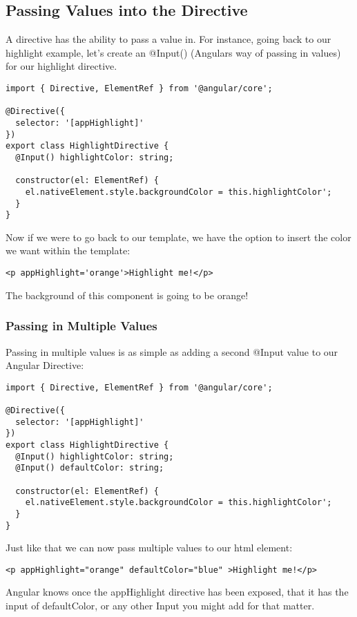 \subsection{ Passing Values into the Directive }
A directive has the ability to pass a value in. For instance, going back to our
highlight example, let's create an @Input() (Angulars way of passing in values)
for our highlight directive.
\begin{lstlisting}
import { Directive, ElementRef } from '@angular/core';

@Directive({
  selector: '[appHighlight]'
})
export class HighlightDirective {
  @Input() highlightColor: string;

  constructor(el: ElementRef) {
    el.nativeElement.style.backgroundColor = this.highlightColor';
  }
}
\end{lstlisting}

Now if we were to go back to our template, we have the option to insert the
color we want within the template:
\begin{lstlisting}
<p appHighlight='orange'>Highlight me!</p>
\end{lstlisting}

The background of this component is going to be orange!

\subsubsection{ Passing in Multiple Values }
Passing in multiple values is as simple as adding a second @Input value to our
Angular Directive:

\begin{lstlisting}
import { Directive, ElementRef } from '@angular/core';

@Directive({
  selector: '[appHighlight]'
})
export class HighlightDirective {
  @Input() highlightColor: string;
  @Input() defaultColor: string;

  constructor(el: ElementRef) {
    el.nativeElement.style.backgroundColor = this.highlightColor';
  }
}
\end{lstlisting}

Just like that we can now pass multiple values to our html element:
\begin{lstlisting}
<p appHighlight="orange" defaultColor="blue" >Highlight me!</p>
\end{lstlisting}

Angular knows once the appHighlight directive has been exposed, that it has the
input of defaultColor, or any other Input you might add for that matter. 

